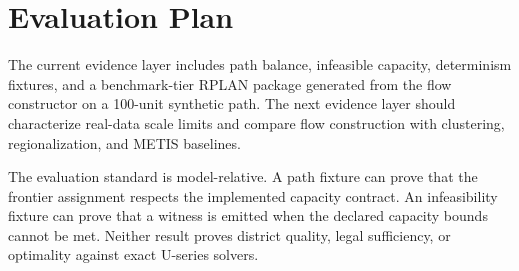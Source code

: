 \section{Evaluation Plan}

The current evidence layer includes path balance, infeasible capacity,
determinism fixtures, and a benchmark-tier RPLAN package generated from the
flow constructor on a 100-unit synthetic path. The next evidence layer should
characterize real-data scale limits and compare flow construction with
clustering, regionalization, and METIS baselines.

\begin{table}[h]
\centering
\small
{}
\caption{Evidence ladder for T.17 claims. Feasibility, witness generation, and
plan quality are separate evidence levels.}
\end{table}

\begin{table}[h]
\centering
\small
{}
\caption{Failure-behavior comparison framing. Quantitative comparisons remain
future work until commands and outputs are recorded.}
\end{table}

The evaluation standard is model-relative. A path fixture can prove that the
frontier assignment respects the implemented capacity contract. An
infeasibility fixture can prove that a witness is emitted when the declared
capacity bounds cannot be met. Neither result proves district quality, legal
sufficiency, or optimality against exact U-series solvers.
